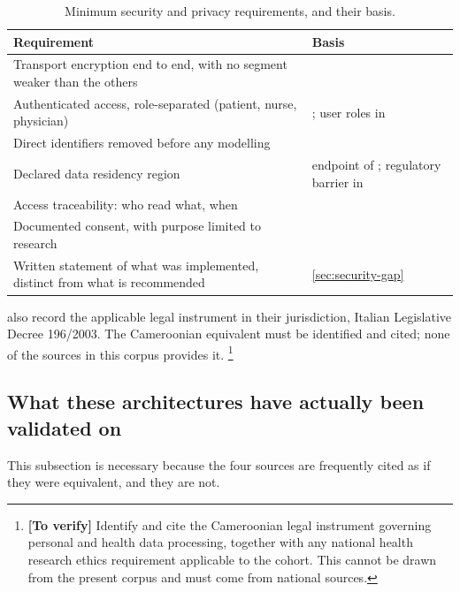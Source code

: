 \documentclass[12pt,a4paper,oneside]{report}
\newcommand{\verify}[1]{\footnote{\textbf{[To verify]} #1}}
\begin{document}
\begin{table}[htbp]
\centering\small
\caption{Minimum security and privacy requirements, and their basis.}\label{tab:security-spec}
\begin{tabularx}{\textwidth}{@{}X >{\raggedright\arraybackslash}p{5.4cm}@{}}
\toprule
\textbf{Requirement} & \textbf{Basis} \\
\midrule
Transport encryption end to end, with no segment weaker than the others & \textcite{mucchi2021} \\
Authenticated access, role-separated (patient, nurse, physician) & \textcite{efendi2025}; user roles in \textcite{yazdani2018} \\
Direct identifiers removed before any modelling & \textcite{cadrage2026} \\
Declared data residency region & endpoint of \textcite{efendi2025}; regulatory barrier in \textcite{dodoo2022} \\
Access traceability: who read what, when & \textcite{mucchi2021} \\
Documented consent, with purpose limited to research & \textcite{cadrage2026} \\
Written statement of what was implemented, distinct from what is recommended & \cref{sec:security-gap} \\
\bottomrule
\end{tabularx}
\end{table}

\Textcite{mucchi2021} also record the applicable legal instrument in their jurisdiction, Italian Legislative Decree 196/2003. The Cameroonian equivalent must be identified and cited; none of the sources in this corpus provides it.%
\verify{Identify and cite the Cameroonian legal instrument governing personal and health data processing, together with any national health research ethics requirement applicable to the cohort. This cannot be drawn from the present corpus and must come from national sources.}

\subsection{What these architectures have actually been validated on}\label{sec:arch-validation}

This subsection is necessary because the four sources are frequently cited as if they were equivalent, and they are not.
\end{document}
